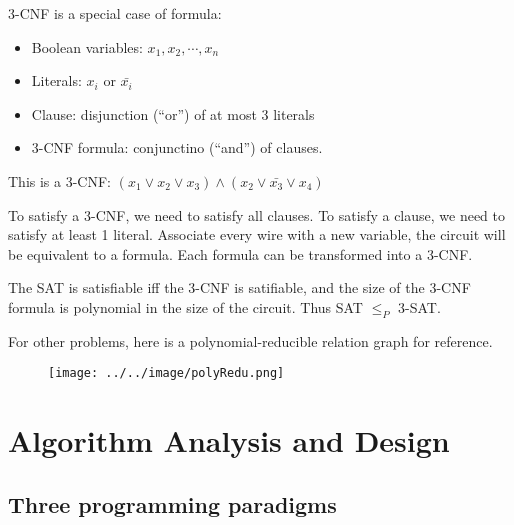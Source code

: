                     \begin{definition}[3-CNF]
                        3-CNF is a special case of formula:
                        \begin{itemize}
                            \item Boolean variables: $x_1, x_2, \cdots, x_n$
                            \item Literals: $x_i$ or $\bar{x_i}$
                            \item Clause: disjunction (``or'') of at most 3 literals
                            \item 3-CNF formula: conjunctino (``and'') of clauses.
                        \end{itemize}
                    \end{definition}

                    \begin{example}
                        This is a 3-CNF: $(x_1 \vee x_2 \vee x_3) \wedge (x_2 \vee \bar{x_3} \vee x_4)$
                    \end{example}

                    To satisfy a 3-CNF, we need to satisfy all clauses. To satisfy a clause, we need to satisfy at least 1 literal. Associate every wire with a new variable, the circuit will be equivalent to a formula. Each formula can be transformed into a 3-CNF. 

                    The SAT is satisfiable iff the 3-CNF is satifiable, and the size of the 3-CNF formula is polynomial in the size of the circuit. Thus SAT $\le_P$ 3-SAT.

                    For other problems, here is a polynomial-reducible relation graph for reference.

                    \begin{figure}[H]
                        \centering
                        \texttt{[image: ../../image/polyRedu.png]}
                    \end{figure}

        \section{Algorithm Analysis and Design}
            \subsection{Three programming paradigms}
